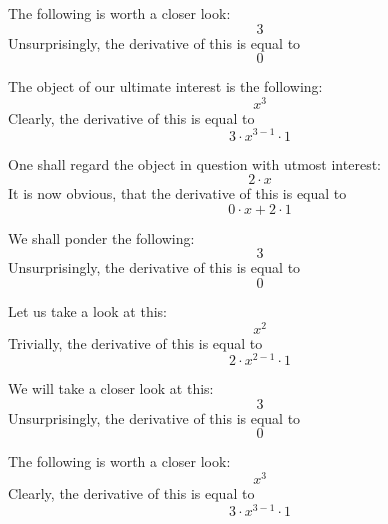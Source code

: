 \documentclass{article}
\begin{document}
The following is worth a closer look:
\begin{equation}
3 
\end{equation}
Unsurprisingly, the derivative of this is equal to
\begin{equation}
0 
\end{equation}

The object of our ultimate interest is the following:
\begin{equation}
x ^{3 } 
\end{equation}
Clearly, the derivative of this is equal to
\begin{equation}
3 \cdot x ^{3 - 1 } \cdot 1 
\end{equation}

One shall regard the object in question with utmost interest:
\begin{equation}
2 \cdot x 
\end{equation}
It is now obvious, that the derivative of this is equal to
\begin{equation}
0 \cdot x + 2 \cdot 1 
\end{equation}

We shall ponder the following:
\begin{equation}
3 
\end{equation}
Unsurprisingly, the derivative of this is equal to
\begin{equation}
0 
\end{equation}

Let us take a look at this:
\begin{equation}
x ^{2 } 
\end{equation}
Trivially, the derivative of this is equal to
\begin{equation}
2 \cdot x ^{2 - 1 } \cdot 1 
\end{equation}

We will take a closer look at this:
\begin{equation}
3 
\end{equation}
Unsurprisingly, the derivative of this is equal to
\begin{equation}
0 
\end{equation}

The following is worth a closer look:
\begin{equation}
x ^{3 } 
\end{equation}
Clearly, the derivative of this is equal to
\begin{equation}
3 \cdot x ^{3 - 1 } \cdot 1 
\end{equation}
\end{document}
